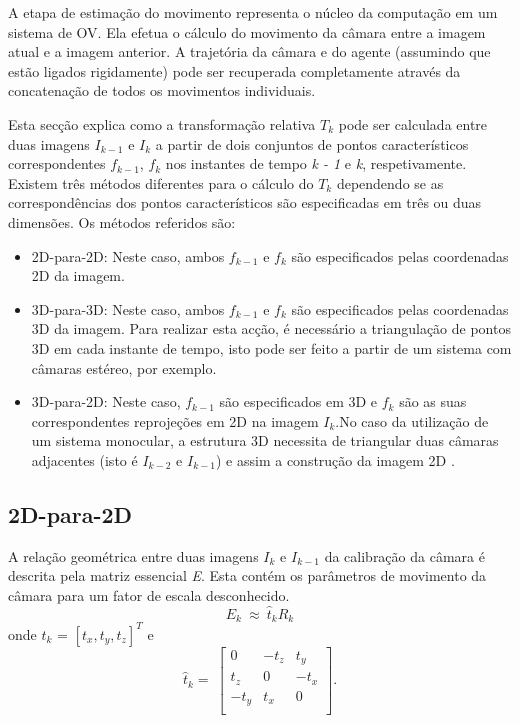 A etapa de estimação do movimento representa o núcleo da computação em um sistema de OV. Ela efetua o cálculo do movimento da câmara entre a imagem atual e a imagem anterior. A trajetória da câmara e do agente (assumindo que estão ligados rigidamente) pode ser recuperada completamente através da concatenação de todos os movimentos individuais.

Esta secção explica como a transformação relativa \textit{$T_k$} pode ser calculada entre duas imagens \textit{$I_{k-1}$} e \textit{$I_k$} a partir de dois conjuntos de pontos característicos correspondentes \textit{$f_{k-1}$}, \textit{$f_k$} nos instantes de tempo \textit{k - 1} e \textit{k}, respetivamente. Existem três métodos diferentes para o cálculo do \textit{$T_k$} dependendo se as correspondências dos pontos característicos são especificadas em três ou duas dimensões. Os métodos referidos são:


\begin{itemize}
	\item 2D-para-2D: Neste caso, ambos \textit{$f_{k-1}$} e \textit{$f_k$} são especificados pelas coordenadas 2D da imagem.
	\item 3D-para-3D: Neste caso, ambos \textit{$f_{k-1}$} e \textit{$f_k$} são especificados pelas coordenadas 3D da imagem. Para realizar esta acção, é necessário a triangulação de pontos 3D em cada instante de tempo, isto pode ser feito a partir de um sistema com câmaras estéreo, por exemplo.
	\item 3D-para-2D: Neste caso, \textit{$f_{k-1}$} são especificados em 3D e \textit{$f_k$} são as suas correspondentes reprojeções em 2D na imagem \textit{$I_k$}.No caso da utilização de um sistema monocular, a estrutura 3D necessita de triangular duas câmaras adjacentes (isto é \textit{$I_{k-2}$} e \textit{$I_{k-1}$}) e assim a construção da imagem 2D . 
\end{itemize}



\subsection{2D-para-2D}

A relação geométrica entre duas imagens \textit{$I_k$} e \textit{$I_{k-1}$} da calibração da câmara é descrita pela matriz essencial \textit{E}. Esta contém os parâmetros de movimento da câmara para um fator de escala desconhecido. \[ E_k\ \approx\ {\hat{t}}_kR_k \] onde \textit{$t_k$} = $[ \textit{$t_x$}, \textit{$t_y$}, \textit{$t_z$} ]^T$ e \[ \hat{t}_k =\ \left[\begin{array}{ccc}0&-t_z&t_y\\t_z&0&-t_x\\-t_y&t_x&0\\\end{array}\right] . \]

